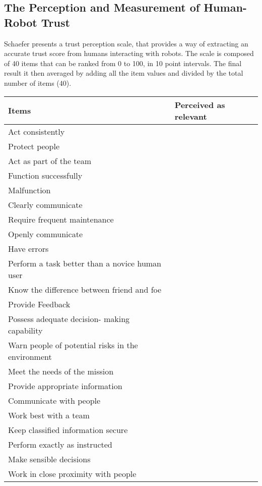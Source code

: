 \subsection{The Perception and Measurement of Human-Robot Trust}

Schaefer\cite{Schaefer2009} presents a trust perception scale, that provides a way of extracting an accurate trust score from humans interacting with robots. The scale is composed of 40 items that can be ranked from 0 to 100, in 10 point intervals. The final result it then averaged by adding all the item values and divided by the total number of items (40).

\begin{table}[]
	\centering
	\begin{tabular}{p{2cm}|l}
		Items & Perceived as relevant \\ \hline
		Act consistently & \\ \hline
		Protect people & \\ \hline
		Act as part of the team & \\ \hline
		Function successfully & \\ \hline
		Malfunction & \\ \hline
		Clearly communicate & \\ \hline
		Require frequent maintenance & \\ \hline
		Openly communicate & \\ \hline
		Have errors & \\ \hline
		Perform a task better than a novice human user & \\ \hline
		Know the difference between friend and foe & \\ \hline
		Provide Feedback & \\ \hline
		Possess adequate decision- making capability & \\ \hline
		Warn people of potential risks in the environment & \\ \hline
		Meet the needs of the mission & \\ \hline
		Provide appropriate information & \\ \hline
		Communicate with people & \\ \hline
		Work best with a team & \\ \hline
		Keep classified information secure & \\ \hline
		Perform exactly as instructed & \\ \hline
		Make sensible decisions & \\ \hline
		Work in close proximity with people & \\ \hline

\end{tabular}
\end{table}
